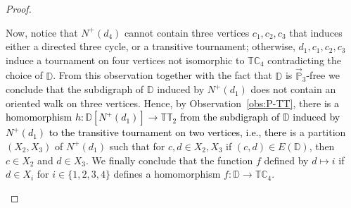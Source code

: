 \documentclass{article}
\theoremstyle{definition}
\theoremstyle{remark}
\newcommand{\blue}[1]{\textcolor{black}{#1}}
\newcommand{\bC}{{\mathbb C}}
\newcommand{\bD}{{\mathbb D}}
\newcommand{\bP}{{\mathbb P}}
\newcommand{\bT}{{\mathbb T}}
\begin{document}
\begin{proof}
\begin{itemize}
        Now, notice that $N^+(d_4)$ cannot contain three vertices
        $c_1,c_2,c_3$ that induces either a directed three cycle, or a transitive tournament;
        otherwise, $d_1,c_1,c_2,c_3$ induce a tournament on four vertices not isomorphic to $\bT\bC_4$
        contradicting the choice of $\bD$. From this observation together with the fact that
        $\bD$ is $\vec{\bP}_3$-free we conclude that the subdigraph of $\bD$ induced by
        $N^+(d_1)$ does not contain an oriented walk on three vertices. Hence, by Observation~\ref{obs:P-TT},
        there \blue{is a homomorphism $h\colon \bD[N^+(d_1)]\to \bT\bT_2$ from the subdigraph of $\bD$
        induced by $N^+(d_1)$ to the transitive tournament on two vertices, i.e., there}
        is a partition $(X_2,X_3)$ of $N^+(d_1)$ such that for $c,d\in X_2,X_3$ if
        $(c,d)\in E(\bD)$, then $c\in X_2$ and $d\in X_3$. We finally conclude that
        the function $f$ defined by $d\mapsto i$ if $d\in X_i$ for $i\in\{1,2,3,4\}$ defines
        a homomorphism $f\colon \bD\to \bT\bC_4$.
    \end{itemize}    
\end{proof}
\end{document}
